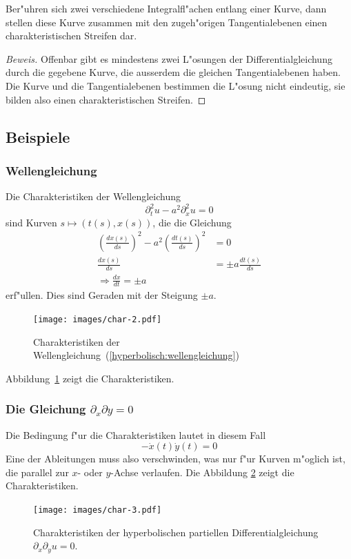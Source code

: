\begin{satz}Ber"uhren sich zwei verschiedene Integralfl"achen entlang einer
Kurve, dann stellen diese Kurve zusammen mit den zugeh"origen Tangentialebenen
einen charakteristischen Streifen dar.
\end{satz}

\begin{proof}[Beweis]
Offenbar gibt es mindestens zwei L"osungen der Differentialgleichung
durch die gegebene Kurve, die ausserdem die gleichen Tangentialebenen
haben. Die Kurve und die Tangentialebenen bestimmen die L"osung nicht
eindeutig, sie bilden also einen charakteristischen Streifen.
\end{proof}

\subsection{Beispiele}
\subsubsection{Wellengleichung}
Die Charakteristiken der Wellengleichung
\begin{equation}
\partial_t^2u-a^2\partial_x^2u=0
\label{hyperbolisch:wellengleichung}
\end{equation}
sind Kurven $s\mapsto(t(s),x(s))$, die die Gleichung
\begin{align*}
\left(
\frac{dx(s)}{ds}\right)^2-a^2\left(\frac{dt(s)}{ds}\right)^2&=0
\\
\frac{dx(s)}{ds}
&=
\pm a\frac{dt(s)}{ds}
\\
\Rightarrow
\frac{dx}{dt}=\pm a
\end{align*}
erf"ullen. Dies sind Geraden mit der Steigung $\pm a$.
\begin{figure}
\begin{center}
\texttt{[image: images/char-2.pdf]}
\end{center}
\caption{Charakteristiken der
Wellengleichung~(\ref{hyperbolisch:wellengleichung})
\label{hyp:wellen}}
\end{figure}
Abbildung~\ref{hyp:wellen} zeigt die Charakteristiken.

\subsubsection{Die Gleichung $\partial_x\partial y=0$} Die Bedingung f"ur die
Charakteristiken lautet in diesem Fall
\[
-\dot x(t)\dot y(t)=0
\]
Eine der Ableitungen muss also verschwinden, was nur f"ur Kurven
m"oglich ist, die parallel zur $x$- oder $y$-Achse verlaufen.
Die Abbildung \ref{hyp:dxdy} zeigt die Charakteristiken.
\begin{figure}
\begin{center}
\texttt{[image: images/char-3.pdf]}
\end{center}
\caption{Charakteristiken der hyperbolischen
partiellen Differentialgleichung
$\partial_x\partial_yu=0$.
\label{hyp:dxdy}}
\end{figure}

